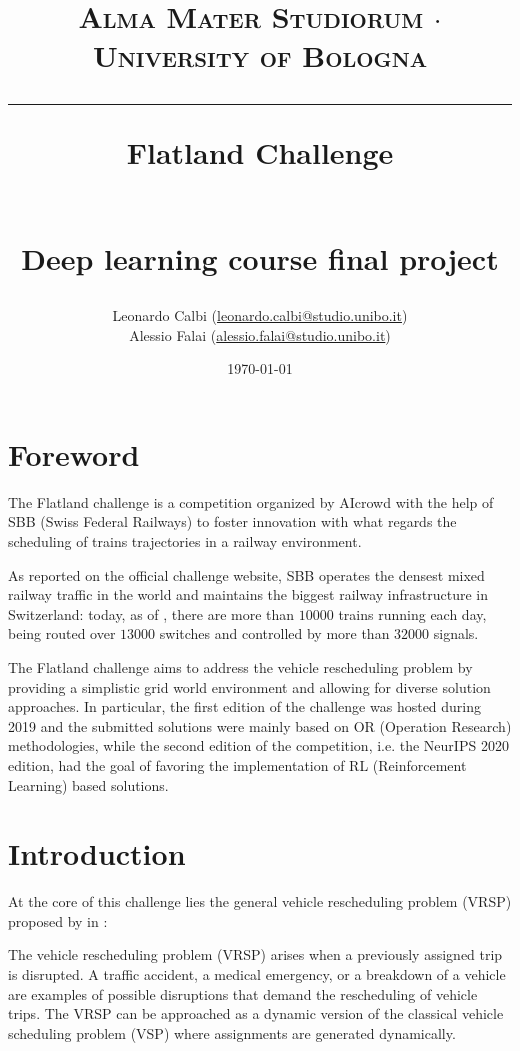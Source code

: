 \documentclass[a4paper,10pt]{report}
\begin{document}
\frenchspacing

\title{
	{{\large{\textsc{Alma Mater Studiorum $\cdot$ University of Bologna}}}}
	\rule{\textwidth}{0.4pt}\vspace{3mm}
	\textbf{Flatland Challenge}
	\begin{figure}[!htb]
		\centering
		
	\end{figure} \\
	Deep learning course final project
}

\author{Leonardo Calbi (\href{mailto:leonardo.calbi@studio.unibo.it}{leonardo.calbi@studio.unibo.it}) \\ Alessio Falai (\href{mailto:alessio.falai@studio.unibo.it}{alessio.falai@studio.unibo.it})}
\date{\today}
\maketitle
\newpage
\tableofcontents
\setcounter{tocdepth}{1}
\listoffigures
\listoftables
\newpage


\chapter*{Foreword}
The Flatland challenge is a competition organized by AIcrowd \cite{aicrowd} with the help of SBB (Swiss Federal Railways) to foster innovation with what regards the scheduling of trains trajectories in a railway environment.

As reported on the official challenge website, SBB operates the densest mixed railway traffic in the world and maintains the biggest railway infrastructure in Switzerland: today, as of \the\year, there are more than $\num{10000}$ trains running each day, being routed over $\num{13000}$ switches and controlled by more than $\num{32000}$ signals.

The Flatland challenge aims to address the vehicle rescheduling problem by providing a simplistic grid world environment and allowing for diverse solution approaches. In particular, the first edition of the challenge was hosted during 2019 and the submitted solutions were mainly based on OR (Operation Research) methodologies, while the second edition of the competition, i.e. the NeurIPS 2020 edition, had the goal of favoring the implementation of RL (Reinforcement Learning) based solutions.


\chapter{Introduction}\label{chap:introduction}
At the core of this challenge lies the general vehicle rescheduling problem (VRSP) proposed by \citeauthor{vrsp} in \citeyear{vrsp} \cite{vrsp}:
\begin{displayquote}
	The vehicle rescheduling problem (VRSP) arises when a previously assigned trip is disrupted. A traffic accident, a medical emergency, or a breakdown of a vehicle are examples of possible disruptions that demand the rescheduling of vehicle trips. The VRSP can be approached as a dynamic version of the classical vehicle scheduling problem (VSP) where assignments are generated dynamically.
\end{displayquote}
\end{document}
